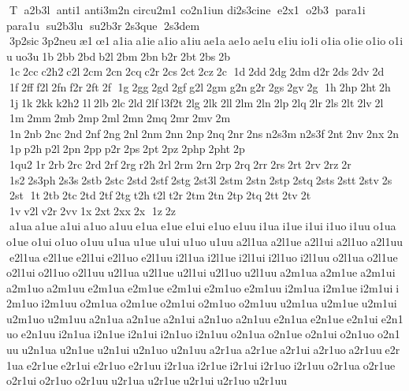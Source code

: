 T  a2b3l  anti1 	 anti3m2n 	 circu2m1 	 co2n1iun 
 di2s3cine  e2x1  o2b3  para1i  para1u  su2b3lu  su2b3r 2s3que  2s3dem  3p2sic 3p2neu æ1 œ1 a1ia a1ie a1io a1iu ae1a ae1o ae1u e1iu io1i o1ia o1ie o1io o1iu uo3u 1b 2bb 2bd b2l 2bm 2bn b2r 2bt 2bs 2b  1c 2cc c2h2 c2l 2cm 2cn 2cq c2r 2cs 2ct 2cz 2c  1d 2dd 2dg 2dm d2r 2ds 2dv 2d  1f 2ff f2l 2fn f2r 2ft 2f  1g 2gg 2gd 2gf g2l 2gm g2n g2r 2gs 2gv 2g  1h 2hp 2ht 2h  1j 1k 2kk k2h2 1l 2lb 2lc 2ld 2lf l3f2t 2lg 2lk 2ll 2lm 2ln 2lp 2lq 2lr   2ls 2lt 2lv 2l  1m 2mm 2mb 2mp 2ml 2mn 2mq 2mr 2mv 2m  1n 2nb 2nc 2nd 2nf 2ng 2nl 2nm 2nn 2np 2nq 2nr 2ns   n2s3m n2s3f 2nt 2nv 2nx 2n  1p p2h p2l 2pn 2pp p2r 2ps 2pt 2pz 2php 2pht 2p  1qu2 1r 2rb 2rc 2rd 2rf 2rg r2h 2rl 2rm 2rn 2rp 2rq 2rr 2rs 2rt   2rv 2rz 2r  1s2 2s3ph 2s3s 2stb 2stc 2std 2stf 2stg 2st3l 2stm 2stn 2stp 2stq   2sts 2stt 2stv 2s  2st  1t 2tb 2tc 2td 2tf 2tg t2h t2l t2r 2tm 2tn 2tp 2tq 2tt   2tv 2t  1v v2l v2r 2vv 1x 2xt 2xx 2x  1z 2z  a1ua a1ue a1ui a1uo a1uu e1ua e1ue e1ui e1uo e1uu i1ua i1ue i1ui i1uo i1uu o1ua o1ue o1ui o1uo o1uu u1ua u1ue u1ui u1uo u1uu a2l1ua a2l1ue a2l1ui a2l1uo a2l1uu e2l1ua e2l1ue e2l1ui e2l1uo e2l1uu i2l1ua i2l1ue i2l1ui i2l1uo i2l1uu o2l1ua o2l1ue o2l1ui o2l1uo o2l1uu u2l1ua u2l1ue u2l1ui u2l1uo u2l1uu a2m1ua a2m1ue a2m1ui a2m1uo a2m1uu e2m1ua e2m1ue e2m1ui e2m1uo e2m1uu i2m1ua i2m1ue i2m1ui i2m1uo i2m1uu o2m1ua o2m1ue o2m1ui o2m1uo o2m1uu u2m1ua u2m1ue u2m1ui u2m1uo u2m1uu a2n1ua a2n1ue a2n1ui a2n1uo a2n1uu e2n1ua e2n1ue e2n1ui e2n1uo e2n1uu i2n1ua i2n1ue i2n1ui i2n1uo i2n1uu o2n1ua o2n1ue o2n1ui o2n1uo o2n1uu u2n1ua u2n1ue u2n1ui u2n1uo u2n1uu a2r1ua a2r1ue a2r1ui a2r1uo a2r1uu e2r1ua e2r1ue e2r1ui e2r1uo e2r1uu i2r1ua i2r1ue i2r1ui i2r1uo i2r1uu o2r1ua o2r1ue o2r1ui o2r1uo o2r1uu u2r1ua u2r1ue u2r1ui u2r1uo u2r1uu